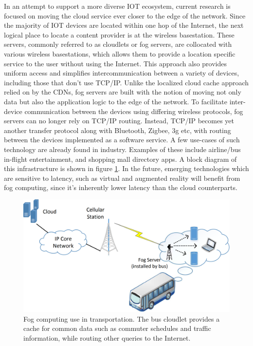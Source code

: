 In an attempt to support a more diverse IOT ecosystem, current research is focused on moving the cloud service ever closer to the edge of the network.
Since the majority of IOT devices are located within one hop of the Internet, the next logical place to locate a content provider is at the wireless basestation.\cite{satyanarayanan2017emergence} These servers, commonly referred to as cloudlets or fog servers, are collocated with various wireless basestations, which allows them to provide a location specific service to the user without using the Internet.
This approach also provides uniform access and simplifies intercommunication between a variety of devices, including those that don't use TCP/IP. Unlike the localized cloud cache approach relied on by the CDNs, fog servers are built with the notion of moving not only data but also the application logic to the edge of the network.
To facilitate inter-device communication between the devices using differing wireless protocols, fog servers can no longer rely on TCP/IP routing.
Instead, TCP/IP becomes yet another transfer protocol along with Bluetooth, Zigbee, 3g etc, with routing between the devices implemented as a software service.\cite{edgeiot} A few use-cases of such technology are already found in industry.
Examples of these include airline/bus in-flight entertainment, and shopping mall directory apps.
A block diagram of this infrastructure is shown in figure \ref{lit:fig:3}.
In the future, emerging technologies which are sensitive to latency, such as virtual and augmented reality will benefit from fog computing, since it's inherently lower latency than the cloud counterparts.

\begin{figure}[h]
    \centering
    \includegraphics[width=0.6\linewidth]{img/fog_comp.png}
    \caption{Fog computing use in transportation.
    The bus cloudlet provides a cache for common data such as commuter schedules and traffic information, while routing other queries to the Internet.\cite{edgeiot}}
    \label{lit:fig:3}
\end{figure}

